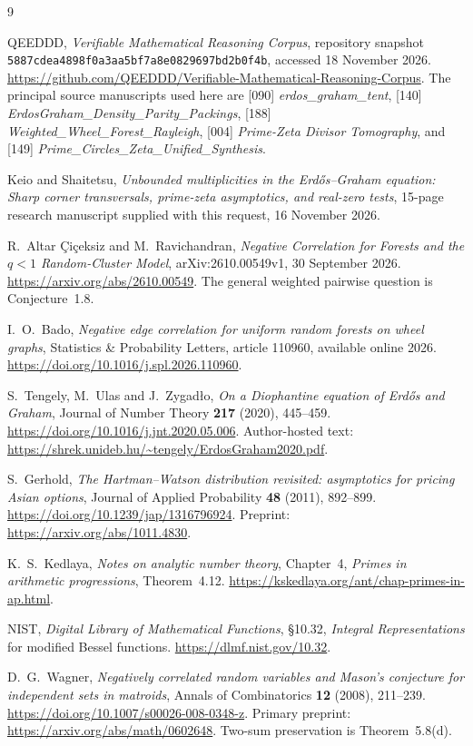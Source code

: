 \documentclass[11pt,a4paper]{article}
\theoremstyle{definition}
\theoremstyle{remark}\newtheorem{remark}[theorem]{Remark}
\begin{document}
\clearpage
\begingroup\raggedright
\begin{thebibliography}{9}

QEEDDD,
\emph{Verifiable Mathematical Reasoning Corpus},
repository snapshot
\texttt{5887cdea4898f0a3aa5bf7a8e0829697bd2b0f4b},
accessed 18 November 2026.
\url{https://github.com/QEEDDD/Verifiable-Mathematical-Reasoning-Corpus}.
The principal source manuscripts used here are [090]
\emph{erdos\_graham\_tent}, [140]
\emph{ErdosGraham\_Density\_Parity\_Packings}, [188]
\emph{Weighted\_Wheel\_Forest\_Rayleigh}, [004]
\emph{Prime-Zeta Divisor Tomography}, and [149]
\emph{Prime\_Circles\_Zeta\_Unified\_Synthesis}.

Keio and Shaitetsu,
\emph{Unbounded multiplicities in the Erd\H{o}s--Graham equation:
Sharp corner transversals, prime-zeta asymptotics, and real-zero tests},
15-page research manuscript supplied with this request,
16 November 2026.

R.~Altar \c{C}i\c{c}eksiz and M.~Ravichandran,
\emph{Negative Correlation for Forests and the $q<1$ Random-Cluster Model},
arXiv:2610.00549v1, 30 September 2026.
\url{https://arxiv.org/abs/2610.00549}.
The general weighted pairwise question is Conjecture~1.8.

I.~O.~Bado,
\emph{Negative edge correlation for uniform random forests on wheel graphs},
Statistics \& Probability Letters, article 110960,
available online 2026.
\url{https://doi.org/10.1016/j.spl.2026.110960}.

S.~Tengely, M.~Ulas and J.~Zygad\l{}o,
\emph{On a Diophantine equation of Erd\H{o}s and Graham},
Journal of Number Theory \textbf{217} (2020), 445--459.
\url{https://doi.org/10.1016/j.jnt.2020.05.006}.
Author-hosted text:
\url{https://shrek.unideb.hu/~tengely/ErdosGraham2020.pdf}.

S.~Gerhold,
\emph{The Hartman--Watson distribution revisited:
asymptotics for pricing Asian options},
Journal of Applied Probability \textbf{48} (2011), 892--899.
\url{https://doi.org/10.1239/jap/1316796924}.
Preprint: \url{https://arxiv.org/abs/1011.4830}.

K.~S.~Kedlaya,
\emph{Notes on analytic number theory}, Chapter~4,
\emph{Primes in arithmetic progressions}, Theorem~4.12.
\url{https://kskedlaya.org/ant/chap-primes-in-ap.html}.

NIST,
\emph{Digital Library of Mathematical Functions},
\S10.32, \emph{Integral Representations} for modified Bessel functions.
\url{https://dlmf.nist.gov/10.32}.

D.~G.~Wagner,
\emph{Negatively correlated random variables and Mason's conjecture
for independent sets in matroids},
Annals of Combinatorics \textbf{12} (2008), 211--239.
\url{https://doi.org/10.1007/s00026-008-0348-z}.
Primary preprint: \url{https://arxiv.org/abs/math/0602648}.
Two-sum preservation is Theorem~5.8(d).
\end{thebibliography}
\endgroup
\end{document}
